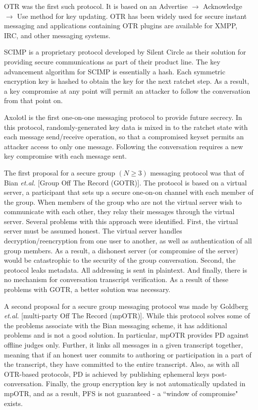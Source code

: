 \documentclass[%
preprint,
amsmath,amssymb,
aps,
prb,
floatfix,
]{revtex4-1}
\begin{document}
OTR was the first such protocol. It is based on an Advertise $\rightarrow$
Acknowledge $\rightarrow$ Use method for key updating. OTR has been widely used
for secure instant messaging and applications containing OTR plugins are
available for XMPP, IRC, and other messaging systems.

SCIMP is a proprietary protocol developed by Silent Circle as their solution for
providing secure communications as part of their product line. The key
advancement algorithm for SCIMP is essentially a hash. Each symmetric encryption
key is hashed to obtain the key for the next ratchet step. As a result, a key
compromise at any point will permit an attacker to follow the conversation from
that point on.

Axolotl is the first one-on-one messaging protocol to provide future secrecy. In
this protocol, randomly-generated key data is mixed in to the ratchet state with
each message send/receive operation, so that a compromised keyset permits an
attacker access to only one message. Following the conversation requires a new
key compromise with each message sent.

The first proposal for a secure group $(N \ge 3)$ messaging protocol was that of
Bian \textit{et.al.}\cite{ref:bian} [Group Off The Record (GOTR)].
The protocol is based on a virtual server,
a participant that sets up a secure one-on-on channel with each member of the group.
When members of the group who are not the virtual server wish to communicate
with each other, they relay their messages through the virtual server. Several
problems with this approach were identified. First, the virtual server must be
assumed honest. The virtual server handles decryption/reencryption from one user
to another, as well as authentication of all group members. As a result, a
dishonest server (or compromise of the server) would be catastrophic to the
security of the group conversation. Second, the protocol leaks metadata. All
addressing is sent in plaintext. And finally, there is no mechanism for
conversation transcript verification. As a result of these problems with GOTR, a
better solution was necessary.

A second proposal for a secure group messaging protocol was made by Goldberg
\textit{et.al.}\cite{ref:goldberg} [multi-party Off The Record (mpOTR)].
While this protocol solves some of the
problems associate with the Bian messaging scheme, it has additional problems
and is not a good solution. In particular, mpOTR provides PD against offline
judges only. Further, it links all messages in a given transcript together,
meaning that if an honest user commits to authoring or participation in a part
of the transcript, they have committed to the entire transcript. Also, as with
all OTR-based protocols, PD is achieved by publishing ephemeral keys
post-conversation. Finally, the group encryption key is not automatically
updated in mpOTR, and as a result, PFS is not guaranteed - a ``window of
compromise" exists.
\end{document}
